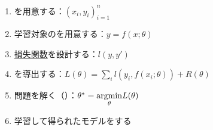 \documentclass[../../../topic_machine-learning]{subfiles}
\begin{document}
\begin{enumerate}
  \item {}を用意する：$(x_i, y_i)_{i=1}^n$
  \item 学習対象のを用意する：$y = f(x;\theta)$
  \item \hyperref[chap:loss-function]{損失関数}を設計する：$l(y,y')$
  \item {}を導出する：$L(\theta) = \sum_i l(y_i, f(x_i;\theta)) + R(\theta)$
  \item {}問題を解く（）：$\theta^* = \underset{\theta}{\operatorname{argmin}} L(\theta)$
  \item 学習して得られたモデルをする
\end{enumerate}

\end{document}
